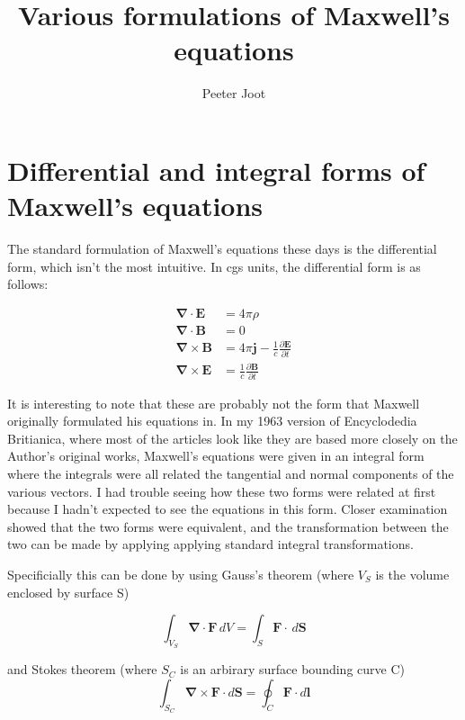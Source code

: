 \documentclass{article}      %
\title{Various formulations of Maxwell's equations} %
\author{Peeter Joot}         %
\newcommand{\grad}[0]{\boldsymbol{\nabla}}
\newcommand{\curl}[0]{\grad \times}
\newcommand{\diverg}[0]{\grad \cdot}
\newcommand{\D}[2] {\frac {\partial #2} {\partial #1}}
\newcommand{\Bj}[0]{\mathbf{j}}
\newcommand{\BB}[0]{\mathbf{B}}
\newcommand{\BE}[0]{\mathbf{E}}
\newcommand{\BF}[0]{\mathbf{F}}
\newcommand{\BS}[0]{\mathbf{S}}
\begin{document}


\section{Differential and integral forms of Maxwell's equations}

The standard formulation of Maxwell's equations these days is the differential
form, which isn't the most intuitive.  In cgs units, the differential
form is as follows:

\begin{align*}
\diverg \BE &= 4\pi\rho \\
\diverg \BB &= 0 \\
\curl \BB &= 4\pi \Bj - \frac{1}{c} \D{t}{\BE} \\
\curl \BE &= \frac{1}{c} \D{t}{\BB}
\end{align*}

It is interesting to note that these are probably not the form that Maxwell 
originally formulated his equations in.  In my 1963 version of Encyclodedia 
Britianica, where most of the articles look like they are based more closely on the Author's
original works, Maxwell's equations were given in an integral form where the 
integrals were all related the tangential and normal components of the various vectors.  I had 
trouble seeing how these two forms were related at first because I hadn't expected to 
see the equations in this form.  Closer examination showed that the two forms 
were equivalent, and the transformation between the two can be made by applying 
applying standard integral transformations.

Specificially this can be done by using Gauss's theorem (where $V_S$ is the volume enclosed by surface S)

\begin{equation*}
\int_{V_S} \diverg \BF\,dV =
\int_S \mathbf{F} \cdot\, d\BS 
\end{equation*}

and Stokes theorem (where $S_C$ is an arbirary surface bounding curve C)
\begin{equation*}
\int_{S_C} \curl \BF \cdot d\BS = \oint_C \mathbf{F} \cdot d\mathbf{l}
\end{equation*}
\end{document}
